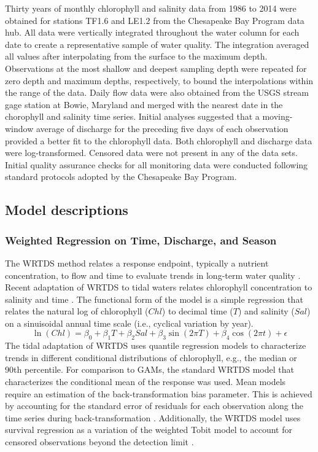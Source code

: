 \documentclass[letterpaper,12pt,oneside]{article}\usepackage[]{graphicx}\usepackage[]{color}
\begin{document}
Thirty years of monthly chlorophyll and salinity data from 1986 to 2014 were obtained for stations TF1.6 and LE1.2 from the Chesapeake Bay Program data hub.  All data were vertically integrated throughout the water column for each date to create a representative sample of water quality.  The integration averaged all values after interpolating from the surface to the maximum depth. Observations at the most shallow and deepest sampling depth were repeated for zero depth and maximum depths, respectively, to bound the interpolations within the range of the data.  Daily flow data were also obtained from the \ac{USGS} stream gage station at Bowie, Maryland and merged with the nearest date in the chorophyll and salinity time series.  Initial analyses suggested that a moving-window average of discharge for the preceding five days of each observation provided a better fit to the chlorophyll data.  Both chlorophyll and discharge data were log-transformed.  Censored data were not present in any of the data sets.  Initial quality assurance checks for all monitoring data were conducted following standard protocols adopted by the Chesapeake Bay Program.        

\subsection{Model descriptions}


\subsubsection{Weighted Regression on Time, Discharge, and Season}

The \ac{WRTDS} method relates a response endpoint, typically a nutrient concentration, to flow and time to evaluate trends in long-term water quality \citep{Hirsch10,Hirsch14}. Recent adaptation of \ac{WRTDS} to tidal waters relates chlorophyll concentration to salinity and time \citep{Beck15}.  The functional form of the model is a simple regression that relates the natural log of chlorophyll ($Chl$) to decimal time ($T$) and salinity ($Sal$) on a sinuisoidal annual time scale (i.e., cyclical variation by year). 
\begin{equation} \label{eqn:funform}
\ln\left(Chl\right) = \beta_0 + \beta_1 T + \beta_2 Sal + \beta_3 \sin\left(2\pi T\right) + \beta_4 \cos\left(2\pi t\right) + \epsilon
\end{equation}
The tidal adaptation of \ac{WRTDS} uses quantile regression models \citep{Cade03} to characterize trends in different conditional distributions of chlorophyll, e.g., the median or 90th percentile. For comparison to \acp{GAM}, the standard \ac{WRTDS} model that characterizes the conditional mean of the response was used.  Mean models require an estimation of the back-transformation bias parameter. This is achieved by accounting for the standard error of residuals for each observation along the time series during back-transformation \citep{Hirsch10}.  Additionally, the \ac{WRTDS} model uses survival regression as a variation of the weighted Tobit model \citep{Tobin58} to account for censored observations beyond the detection limit \citep{Hirsch14}.
\end{document}

